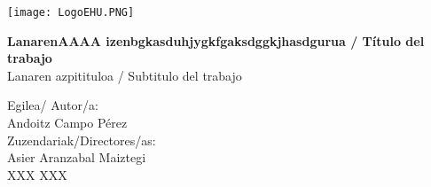 \documentclass[12pt]{article}
\begin{document}
\renewcommand{\listtablename}{Índice de tablas}
\renewcommand{\tablename}{Tabla}


\begin{titlepage}
\hspace*{-3.5cm}
    \begin{minipage}{\textwidth}
        \vspace{-2.5cm}
        \begin{center}
    

            \texttt{[image: LogoEHU.PNG]}
        \end{center}
    \end{minipage}

\vspace{1cm}

\hspace{-3.1cm}
\noindent{}


\vspace{0.8cm}

\noindent\hspace*{-2.5cm}%
\colorbox{light-gray}{\begin{minipage}{\paperwidth}%

    \vspace{1cm}

    \color{RoyalBlue}
    \centering\Large\textbf{ LanarenAAAA izenbgkasduhjygkfgaksdggkjhasdgurua / Título del trabajo}
    \\
    \centering\textmd{ Lanaren azpitituloa / Subtitulo del trabajo}


    \vspace{6cm}\mbox{}
  \end{minipage}
}

\begin{flushright}
 Egilea/ Autor/a:
\\
Andoitz Campo Pérez
\\
Zuzendariak/Directores/as:
\\
Asier Aranzabal Maiztegi
\\
XXX XXX                      
\\
\end{flushright}


\end{titlepage}
\end{document}
